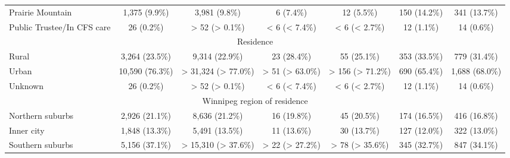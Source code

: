 \documentclass{article}
\begin{document}
\begin{table}[htbp]
\begin{tabular}{l*{6}{c}}
  Prairie Mountain                                      &          1,375 (9.9\%)          &          3,981 (9.8\%)          &            6 (7.4\%)            &            12 (5.5\%)           &           150 (14.2\%)          &           341 (13.7\%)          \\
  Public Trustee/In CFS care                            &            26 (0.2\%)           &          > 52 (> 0.1\%)         &          < 6 (< 7.4\%)          &          < 6 (< 2.7\%)          &            12 (1.1\%)           &            14 (0.6\%)           \\
\multicolumn{7}{c}{Residence                                               }\\
  Rural                                                 &          3,264 (23.5\%)         &          9,314 (22.9\%)         &           23 (28.4\%)           &           55 (25.1\%)           &           353 (33.5\%)          &           779 (31.4\%)          \\
  Urban                                                 &         10,590 (76.3\%)         &       > 31,324 (> 77.0\%)       &         > 51 (> 63.0\%)         &         > 156 (> 71.2\%)        &           690 (65.4\%)          &          1,688 (68.0\%)         \\
  Unknown                                               &            26 (0.2\%)           &          > 52 (> 0.1\%)         &          < 6 (< 7.4\%)          &          < 6 (< 2.7\%)          &            12 (1.1\%)           &            14 (0.6\%)           \\
\multicolumn{7}{c}{Winnipeg region of residence                            }\\
  Northern suburbs                                      &          2,926 (21.1\%)         &          8,636 (21.2\%)         &           16 (19.8\%)           &           45 (20.5\%)           &           174 (16.5\%)          &           416 (16.8\%)          \\
  Inner city                                            &          1,848 (13.3\%)         &          5,491 (13.5\%)         &           11 (13.6\%)           &           30 (13.7\%)           &           127 (12.0\%)          &           322 (13.0\%)          \\
  Southern suburbs                                      &          5,156 (37.1\%)         &       > 15,310 (> 37.6\%)       &         > 22 (> 27.2\%)         &         > 78 (> 35.6\%)         &           345 (32.7\%)          &           847 (34.1\%)          \\

\end{tabular}
\end{table}
\end{document}

